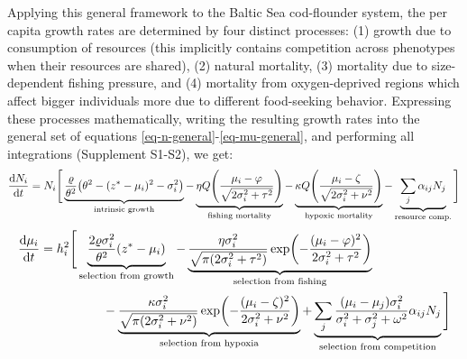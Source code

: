 \documentclass[12pt]{article}
\newcommand{\ud}{\text{d}}
\let\originalleft\left
\let\originalright\right
\renewcommand{\left}{\mathopen{}\mathclose\bgroup\originalleft}
\renewcommand{\right}{\aftergroup\egroup\originalright}
\begin{document}
Applying this general framework to the Baltic Sea cod-flounder system, the per capita growth rates are determined by four distinct processes: (1) growth due to consumption of resources (this implicitly contains competition across phenotypes when their resources are shared), (2) natural mortality, (3) mortality due to size-dependent fishing pressure, and (4) mortality from oxygen-deprived regions which affect bigger individuals more due to different food-seeking behavior. Expressing these processes mathematically, writing the resulting growth rates into the general set of equations \eqref{eq-n-general}-\eqref{eq-mu-general}, and performing all integrations (Supplement S1-S2), we get:
\begin{equation}
  \label{eq-n}
  \frac{\ud N_i}{\ud t}
  = N_i \Bigg[ \underbrace{\frac{\varrho}{\theta^2}
  \left(\theta^2 - (z^*-\mu_i)^2 - \sigma_i^2 \right)}_{\text{intrinsic growth}}
  - \underbrace{\eta Q\left(\frac{\mu_i-\varphi}
  {\sqrt{2\sigma_i^2+\tau^2}}\right)}_{\text{fishing mortality}}
  - \underbrace{\kappa Q \left(\frac{\mu_i-\zeta}
  {\sqrt{2\sigma_i^2+\nu^2}}\right)}_{\text{hypoxic mortality}}
  - \underbrace{\sum_j \alpha_{ij} N_j}_{\text{resource comp.}} \Bigg]
\end{equation}
\begin{equation}
  \label{eq-mu}
  \begin{split}
  \frac{\ud \mu_i}{\ud t}
  &= h_i^2 \Bigg[
  \underbrace{\frac{2\varrho\sigma_i^2}{\theta^2}\left(z^*-\mu_i\right)}_{\text{selection from growth}} -
  \underbrace{\frac{\eta\sigma_i^2}{\sqrt{\pi(2\sigma_i^2+\tau^2)}}
  \exp\left( -\frac{(\mu_i-\varphi)^2}{2\sigma_i^2+\tau^2}\right)}_{\text{selection from fishing}}
  \\ & \qquad\qquad\quad -
  \underbrace{\frac{\kappa\sigma_i^2}{\sqrt{\pi(2\sigma_i^2+\nu^2)}}
  \exp\left( -\frac{(\mu_i-\zeta)^2}{2\sigma_i^2+\nu^2} \right)}_{\text{selection from hypoxia}}
  + \underbrace{\sum_j \frac{(\mu_i - \mu_j) \sigma_i^2}{\sigma_i^2 + \sigma_j^2 + \omega^2} \alpha_{ij} N_j}_{\text{selection from competition}} \Bigg]
  \end{split}
\end{equation}
\end{document}

